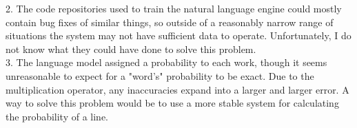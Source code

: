 \documentclass[12pt, a4paper]{article}
\begin{document}
	2. The code repositories used to train the natural language engine could mostly contain bug fixes of similar things, so outside of a reasonably narrow range of situations the system may not have sufficient data to operate.  Unfortunately, I do not know what they could have done to solve this problem.\\

	3. The language model assigned a probability to each work, though it seems unreasonable to expect for a "word's" probability to be exact.  Due to the multiplication operator, any inaccuracies expand into a larger and larger error.  A way to solve this problem would be to use a more stable system for calculating the probability of a line.\\
\end{document}
